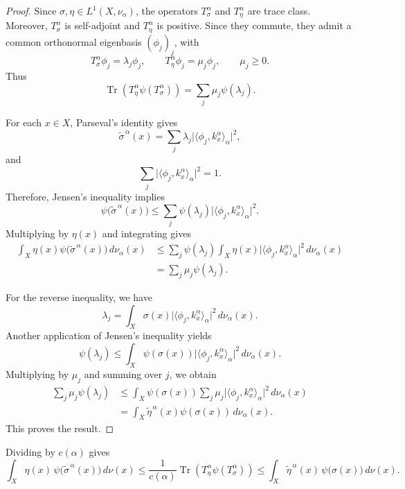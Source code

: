 \documentclass{amsart}
\theoremstyle{definition}
\theoremstyle{remark}
\numberwithin{equation}{section}
\begin{document}
\begin{proof}
Since $\sigma,\eta\in L^1(X,\nu_\alpha)$, the operators
$T_\sigma^\alpha$ and $T_\eta^\alpha$ are trace class. Moreover,
$T_\sigma^\alpha$ is self-adjoint and $T_\eta^\alpha$ is positive.
Since they commute, they admit a common orthonormal eigenbasis
$(\phi_j)_j$, with
\[
T_\sigma^\alpha\phi_j=\lambda_j\phi_j,
\qquad
T_\eta^\alpha\phi_j=\mu_j\phi_j,
\qquad
\mu_j\geq 0.
\]
Thus
\[
\operatorname{Tr}\!\left(
T_\eta^\alpha\psi(T_\sigma^\alpha)
\right)
=
\sum_j\mu_j\psi(\lambda_j).
\]

For each $x\in X$, Parseval's identity gives
\[
\widetilde{\sigma}^{\,\alpha}(x)
=
\sum_j\lambda_j
\bigl|\langle\phi_j,k_x^\alpha\rangle_\alpha\bigr|^2,
\]
and
\[
\sum_j
\bigl|\langle\phi_j,k_x^\alpha\rangle_\alpha\bigr|^2
=1.
\]
Therefore, Jensen's inequality implies
\[
\psi\bigl(\widetilde{\sigma}^{\,\alpha}(x)\bigr)
\leq
\sum_j\psi(\lambda_j)
\bigl|\langle\phi_j,k_x^\alpha\rangle_\alpha\bigr|^2.
\]
Multiplying by $\eta(x)$ and integrating gives
\[
\begin{aligned}
\int_X\eta(x)
\psi\bigl(\widetilde{\sigma}^{\,\alpha}(x)\bigr)
\,d\nu_\alpha(x)
&\leq
\sum_j\psi(\lambda_j)
\int_X\eta(x)
\bigl|\langle\phi_j,k_x^\alpha\rangle_\alpha\bigr|^2
\,d\nu_\alpha(x)\\
&=
\sum_j\mu_j\psi(\lambda_j).
\end{aligned}
\]

For the reverse inequality, we have
\[
\lambda_j
=
\int_X\sigma(x)
\bigl|\langle\phi_j,k_x^\alpha\rangle_\alpha\bigr|^2
\,d\nu_\alpha(x).
\]
Another application of Jensen's inequality yields
\[
\psi(\lambda_j)
\leq
\int_X\psi(\sigma(x))
\bigl|\langle\phi_j,k_x^\alpha\rangle_\alpha\bigr|^2
\,d\nu_\alpha(x).
\]
Multiplying by $\mu_j$ and summing over $j$, we obtain
\[
\begin{aligned}
\sum_j\mu_j\psi(\lambda_j)
&\leq
\int_X\psi(\sigma(x))
\sum_j\mu_j
\bigl|\langle\phi_j,k_x^\alpha\rangle_\alpha\bigr|^2
\,d\nu_\alpha(x)\\
&=
\int_X
\widetilde{\eta}^{\,\alpha}(x)
\psi(\sigma(x))\,d\nu_\alpha(x).
\end{aligned}
\]
This proves the result.
\end{proof}

Dividing by $c(\alpha)$ gives
\begin{equation}\label{renorm2}
\int_X
\eta(x)\,
\psi\bigl(\widetilde{\sigma}^{\,\alpha}(x)\bigr)
\,d\nu(x)
\leq
\frac{1}{c(\alpha)}
\operatorname{Tr}\!\left(
T_\eta^\alpha\psi(T_\sigma^\alpha)
\right)
\leq
\int_X
\widetilde{\eta}^{\,\alpha}(x)\,
\psi\bigl(\sigma(x)\bigr)
\,d\nu(x).
\end{equation}
\end{document}
